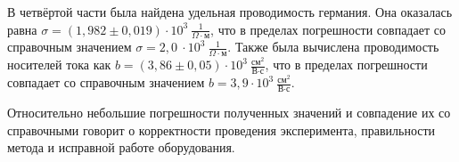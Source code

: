\documentclass[a4paper,10pt]{article}
\begin{document}
В четвёртой части была найдена удельная проводимость германия. Она оказалась равна $\sigma=\left(1,982\pm0,019\right)\cdot10^3~\frac{1}{\Omega\cdot\text{м}}$, что в пределах погрешности совпадает со справочным значением $\sigma=2,0~\cdot10^3~\frac{1}{\Omega\cdot\text{м}}$. Также была вычислена проводимость носителей тока как $b=\left(3,86\pm0,05\right)\cdot10^3~\frac{\text{см}^2}{\text{В}\cdot\text{с}}$, что в пределах погрешности совпадает со справочным значением $b=3,9\cdot10^3~\frac{\text{см}^2}{\text{В}\cdot\text{с}}$.

Относительно небольшие погрешности полученных значений и совпадение их со справочными говорит о корректности проведения эксперимента, правильности метода и исправной работе оборудования.
\end{document}
